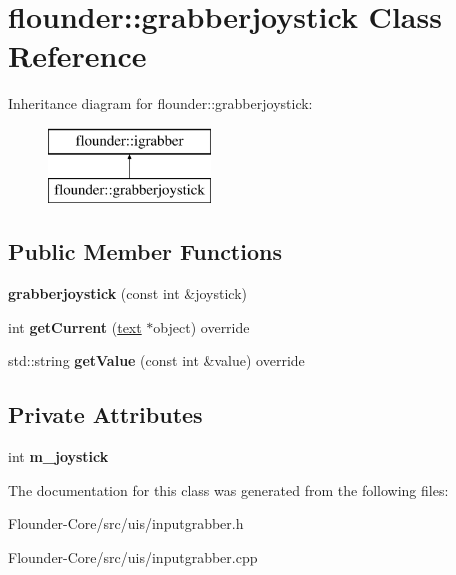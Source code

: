 \hypertarget{classflounder_1_1grabberjoystick}{}\section{flounder\+:\+:grabberjoystick Class Reference}
\label{classflounder_1_1grabberjoystick}
Inheritance diagram for flounder\+:\+:grabberjoystick\+:\begin{figure}[H]
\begin{center}
\leavevmode
\includegraphics[height=2.000000cm]{classflounder_1_1grabberjoystick}
\end{center}
\end{figure}
\subsection*{Public Member Functions}
\begin{DoxyCompactItemize}
\item 
\mbox{\label{classflounder_1_1grabberjoystick_a6dedf47e19d77f14d1bcd4f3544ed10a}} 
{\bfseries grabberjoystick} (const int \&joystick)
\item 
\mbox{\label{classflounder_1_1grabberjoystick_ad2755c3e80f83cf63124add2571f194c}} 
int {\bfseries get\+Current} (\hyperlink{classflounder_1_1text}{text} $\ast$object) override
\item 
\mbox{\label{classflounder_1_1grabberjoystick_a17d03c76fcdec47283904d63cbd8b9f5}} 
std\+::string {\bfseries get\+Value} (const int \&value) override
\end{DoxyCompactItemize}
\subsection*{Private Attributes}
\begin{DoxyCompactItemize}
\item 
\mbox{\label{classflounder_1_1grabberjoystick_a1e41b76d6df5ecf30081747048aa76bf}} 
int {\bfseries m\+\_\+joystick}
\end{DoxyCompactItemize}


The documentation for this class was generated from the following files\+:\begin{DoxyCompactItemize}
\item 
Flounder-\/\+Core/src/uis/inputgrabber.\+h\item 
Flounder-\/\+Core/src/uis/inputgrabber.\+cpp\end{DoxyCompactItemize}
